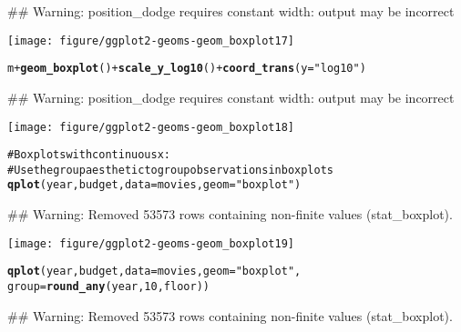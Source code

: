 \documentclass[a4paper,titlepage]{tufte-handout}\usepackage{graphicx, color}
\makeatletter
\def\maxwidth{ %
  \ifdim\Gin@nat@width>\linewidth
    \linewidth
  \else
    \Gin@nat@width
  \fi
}
\newcommand{\hlfunctioncall}[1]{\textcolor[rgb]{0.501960784313725,0,0.329411764705882}{\textbf{#1}}}%
\newcommand{\hlstring}[1]{\textcolor[rgb]{0.6,0.6,1}{#1}}%
\newcommand{\hlcomment}[1]{\textcolor[rgb]{0.180392156862745,0.6,0.341176470588235}{#1}}%
\newenvironment{kframe}{%
 \def\at@end@of@kframe{}%
 \ifinner\ifhmode%
  \def\at@end@of@kframe{\end{minipage}}%
  \begin{minipage}{\columnwidth}%
 \fi\fi%
 \def\FrameCommand##1{\hskip\@totalleftmargin \hskip-\fboxsep
 \colorbox{shadecolor}{##1}\hskip-\fboxsep
     \hskip-\linewidth \hskip-\@totalleftmargin \hskip\columnwidth}%
 \MakeFramed {\advance\hsize-\width
   \@totalleftmargin\z@ \linewidth\hsize
   \@setminipage}}%
 {\par\unskip\endMakeFramed%
 \at@end@of@kframe}
\newenvironment{knitrout}{}{} %
\makeatother
\begin{document}
\begin{knitrout}
\begin{kframe}
{\ttfamily\noindent\textcolor{warningcolor}{\#\# Warning: position\_dodge requires constant width: output may be incorrect}}\end{kframe}\texttt{[image: figure/ggplot2-geoms-geom\_boxplot17]} \begin{kframe}\begin{alltt}
m + \hlfunctioncall{geom_boxplot}() + \hlfunctioncall{scale_y_log10}() + \hlfunctioncall{coord_trans}(y = \hlstring{"log10"})
\end{alltt}


{\ttfamily\noindent\textcolor{warningcolor}{\#\# Warning: position\_dodge requires constant width: output may be incorrect}}\end{kframe}\texttt{[image: figure/ggplot2-geoms-geom\_boxplot18]} \begin{kframe}\begin{alltt}
\hlcomment{# Boxplots with continuous x:}
\hlcomment{# Use the group aesthetic to group observations in boxplots}
\hlfunctioncall{qplot}(year, budget, data = movies, geom = \hlstring{"boxplot"})
\end{alltt}


{\ttfamily\noindent\textcolor{warningcolor}{\#\# Warning: Removed 53573 rows containing non-finite values (stat\_boxplot).}}\end{kframe}\texttt{[image: figure/ggplot2-geoms-geom\_boxplot19]} \begin{kframe}\begin{alltt}
\hlfunctioncall{qplot}(year, budget, data = movies, geom = \hlstring{"boxplot"},
  group = \hlfunctioncall{round_any}(year, 10, floor))
\end{alltt}


{\ttfamily\noindent\textcolor{warningcolor}{\#\# Warning: Removed 53573 rows containing non-finite values (stat\_boxplot).}}


\end{kframe}
\end{knitrout}
\end{document}
